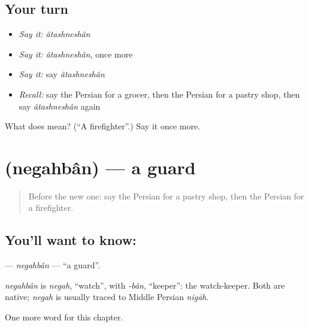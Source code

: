 \subsection*{Your turn}
\begin{itemize}
\raggedright
  \item \emph{Say it:} \emph{âtashneshân}
  \item \emph{Say it:} \emph{âtashneshân}, once more
  \item \emph{Say it:} say \emph{âtashneshân}
  \item \emph{Recall:} say the Persian for a grocer, then the Persian for a pastry shop, then say \emph{âtashneshân} again
\end{itemize}

\begin{tcolorbox}[breakable,colback=teal!4,colframe=teal!35!black,title={Before you move on}]
What does   mean? (\textquotedblleft{}A firefighter\textquotedblright{}.) Say it once more.
\end{tcolorbox}
\section[\texorpdfstring{\fa{نگهبان} (negahbân)}{نگهبان (negahbân)}]{ (negahbân) — a guard}

\label{lesson:FA-C252-negahban}



\begin{quote}
Before the new one: say the Persian for a pastry shop, then the Persian for a firefighter.
\end{quote}

\subsection*{You'll want to know: }
\textbf{} — \emph{negahbân} — \textquotedblleft{}a guard\textquotedblright{}.

\begin{cousinweb}
\emph{negahbân} is \emph{negah}, \textquotedblleft{}watch\textquotedblright{}, with \emph{-bân}, \textquotedblleft{}keeper\textquotedblright{}: the watch-keeper. Both are native; \emph{negah} is usually traced to Middle Persian \emph{nigāh}.
\end{cousinweb}

\begin{grammarlens}[title={What you've built}]
One more word for this chapter.
\end{grammarlens}

